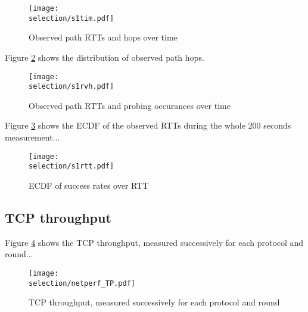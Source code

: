 \documentclass[a4paper,12pt,twoside]{article}
\begin{document}
\begin{figure}[!ht]
\centering
\texttt{[image: \\selection/s1tim.pdf]}
\caption{Observed path RTTs and hops over time }
\label{fig:ptim}
\end{figure}

Figure \ref{fig:prvh} shows the distribution of observed path hops.

\begin{figure}[!ht]
\centering
\texttt{[image: \\selection/s1rvh.pdf]}
\caption{Observed path RTTs and probing occurances over time }
\label{fig:prvh}
\end{figure}

Figure \ref{fig:prtt} shows the ECDF of the observed RTTs during the
whole 200 seconds measurement... 


\begin{figure}[!ht]
\centering
\texttt{[image: \\selection/s1rtt.pdf]}
\caption{ECDF of success rates over RTT}
\label{fig:prtt}
\end{figure}


\subsection{TCP throughput}

Figure \ref{fig:netperf} shows the TCP throughput, measured successively
for each protocol and round...

\begin{figure}[!ht]
\centering
\texttt{[image: \\selection/netperf\_TP.pdf]}
\caption{TCP throughput, measured successively for each protocol and round}
\label{fig:netperf}
\end{figure}







\end{document}

